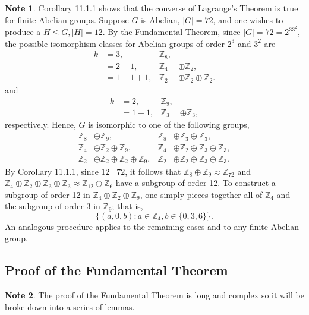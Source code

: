 \documentclass{article}
\theoremstyle{definition}
\newtheorem{note}{Note}[section]
\begin{document}
    \begin{note}
        Corollary 11.1.1 shows that the converse of Lagrange's Theorem is true for finite Abelian groups. Suppose $G$ is Abelian, $|G|=72$,  and one wishes to produce a $H \leq G, |H|=12$. By the Fundamental Theorem, since $|G|=72=2^33^2$, the possible isomorphism classes for Abelian groups of order $2^3$ and $3^2$ are
        \begin{align*}
            k&=3, & \mathbb{Z}_8, \\
            &=2+1, & \mathbb{Z}_4&\oplus\mathbb{Z}_2, \\ &=1+1+1, &\mathbb{Z}_2&\oplus\mathbb{Z}_2\oplus\mathbb{Z}_2.
        \end{align*}
        and
        \begin{align*}
            k&=2, & \mathbb{Z}_9, \\
            &=1+1, & \mathbb{Z}_3&\oplus\mathbb{Z}_3,
        \end{align*}
        respectively. Hence, $G$ is isomorphic to one of the following groups,
        \begin{align*}
            \mathbb{Z}_8&\oplus\mathbb{Z}_9, & \mathbb{Z}_8&\oplus\mathbb{Z}_3\oplus\mathbb{Z}_3, \\
            \mathbb{Z}_4&\oplus\mathbb{Z}_2\oplus\mathbb{Z}_9, & \mathbb{Z}_4&\oplus\mathbb{Z}_2\oplus\mathbb{Z}_3\oplus\mathbb{Z}_3, \\
            \mathbb{Z}_2&\oplus\mathbb{Z}_2\oplus\mathbb{Z}_2\oplus\mathbb{Z}_9, & \mathbb{Z}_2&\oplus\mathbb{Z}_2\oplus\mathbb{Z}_3\oplus\mathbb{Z}_3.
        \end{align*}
        By Corollary 11.1.1, since $12\mid72$, it follows that $\mathbb{Z}_8\oplus\mathbb{Z}_9\approx\mathbb{Z}_{72}$ and $\mathbb{Z}_4\oplus\mathbb{Z}_2\oplus\mathbb{Z}_3\oplus\mathbb{Z}_3\approx\mathbb{Z}_{12}\oplus\mathbb{Z}_6$ have a subgroup of order 12. To construct a subgroup of order 12 in $\mathbb{Z}_4\oplus\mathbb{Z}_2\oplus\mathbb{Z}_9$, one simply pieces together all of $\mathbb{Z}_4$ and the subgroup of order 3 in $\mathbb{Z}_9$; that is,
        \begin{equation*}
            \{(a,0,b):a\in\mathbb{Z}_4,b\in\{0,3,6\}\}.
        \end{equation*}
        An analogous procedure applies to the remaining cases and to any finite Abelian group.
    \end{note}
    
    \subsection{Proof of the Fundamental Theorem}
    \begin{note}
        The proof of the Fundamental Theorem is long and complex so it will be broke down into a series of lemmas.
    \end{note}
    
\end{document}
